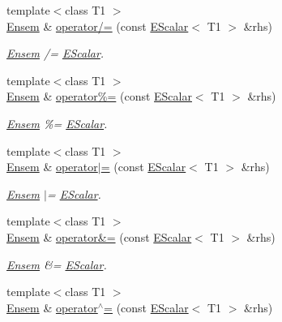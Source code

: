 \begin{DoxyCompactItemize}
{\footnotesize template$<$class T1 $>$ }\\\mbox{\hyperlink{classENSEM_1_1Ensem}{Ensem}} \& \mbox{\hyperlink{classENSEM_1_1Ensem_a32bf70c0844ce98695151457bf9df018}{operator/=}} (const \mbox{\hyperlink{classENSEM_1_1EScalar}{E\+Scalar}}$<$ T1 $>$ \&rhs)
\begin{DoxyCompactList}\small\item\em \mbox{\hyperlink{classENSEM_1_1Ensem}{Ensem}} /= \mbox{\hyperlink{classENSEM_1_1EScalar}{E\+Scalar}}. \end{DoxyCompactList}\item 
{\footnotesize template$<$class T1 $>$ }\\\mbox{\hyperlink{classENSEM_1_1Ensem}{Ensem}} \& \mbox{\hyperlink{classENSEM_1_1Ensem_a8f910ad50fa1625b535bd2456aa7ad64}{operator\%=}} (const \mbox{\hyperlink{classENSEM_1_1EScalar}{E\+Scalar}}$<$ T1 $>$ \&rhs)
\begin{DoxyCompactList}\small\item\em \mbox{\hyperlink{classENSEM_1_1Ensem}{Ensem}} \%= \mbox{\hyperlink{classENSEM_1_1EScalar}{E\+Scalar}}. \end{DoxyCompactList}\item 
{\footnotesize template$<$class T1 $>$ }\\\mbox{\hyperlink{classENSEM_1_1Ensem}{Ensem}} \& \mbox{\hyperlink{classENSEM_1_1Ensem_aa0c3f80e393be46c6f0a1cb3bbdfb170}{operator$\vert$=}} (const \mbox{\hyperlink{classENSEM_1_1EScalar}{E\+Scalar}}$<$ T1 $>$ \&rhs)
\begin{DoxyCompactList}\small\item\em \mbox{\hyperlink{classENSEM_1_1Ensem}{Ensem}} $\vert$= \mbox{\hyperlink{classENSEM_1_1EScalar}{E\+Scalar}}. \end{DoxyCompactList}\item 
{\footnotesize template$<$class T1 $>$ }\\\mbox{\hyperlink{classENSEM_1_1Ensem}{Ensem}} \& \mbox{\hyperlink{classENSEM_1_1Ensem_ab5e9900522968210e53ec66b09a402fe}{operator\&=}} (const \mbox{\hyperlink{classENSEM_1_1EScalar}{E\+Scalar}}$<$ T1 $>$ \&rhs)
\begin{DoxyCompactList}\small\item\em \mbox{\hyperlink{classENSEM_1_1Ensem}{Ensem}} \&= \mbox{\hyperlink{classENSEM_1_1EScalar}{E\+Scalar}}. \end{DoxyCompactList}\item 
{\footnotesize template$<$class T1 $>$ }\\\mbox{\hyperlink{classENSEM_1_1Ensem}{Ensem}} \& \mbox{\hyperlink{classENSEM_1_1Ensem_a7f9a469a80ccb509892aef8d356fd81e}{operator$^\wedge$=}} (const \mbox{\hyperlink{classENSEM_1_1EScalar}{E\+Scalar}}$<$ T1 $>$ \&rhs)

\end{DoxyCompactItemize}
